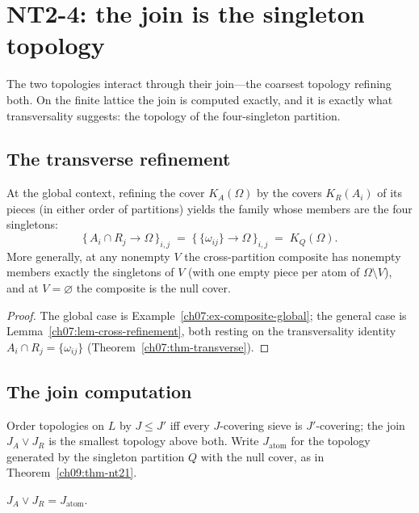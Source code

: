 \section{NT2-4: the join is the singleton topology}\label{ch09:sec-nt24}

The two topologies interact through their join---the coarsest topology refining both. On the finite lattice the join is computed exactly, and it is exactly what transversality suggests: the topology of the four-singleton partition.

\subsection{The transverse refinement}

\begin{lemma}\label{ch09:lem-refinement}
At the global context, refining the cover $K_{A}(\Omega)$ by the covers $K_{R}(A_{i})$ of its pieces (in either order of partitions) yields the family whose members are the four singletons:
\[
\{\,A_{i}\cap R_{j}\to\Omega\,\}_{i,j}\;=\;\{\,\{\omega_{ij}\}\to\Omega\,\}_{i,j}\;=\;K_{Q}(\Omega).
\]
More generally, at any nonempty $V$ the cross-partition composite has nonempty members exactly the singletons of $V$ (with one empty piece per atom of $\Omega\setminus V$), and at $V=\varnothing$ the composite is the null cover.
\end{lemma}

\begin{proof}
The global case is Example~\ref{ch07:ex-composite-global}; the general case is Lemma~\ref{ch07:lem-cross-refinement}, both resting on the transversality identity $A_{i}\cap R_{j}=\{\omega_{ij}\}$ (Theorem~\ref{ch07:thm-transverse}).
\end{proof}

\subsection{The join computation}

Order topologies on $L$ by $J\le J'$ iff every $J$-covering sieve is $J'$-covering; the join $J_{A}\vee J_{R}$ is the smallest topology above both. Write $J_{\mathrm{atom}}$ for the topology generated by the singleton partition $Q$ with the null cover, as in Theorem~\ref{ch09:thm-nt21}.

\begin{lemma}\label{ch09:lem-join}
$J_{A}\vee J_{R}=J_{\mathrm{atom}}$.
\end{lemma}

